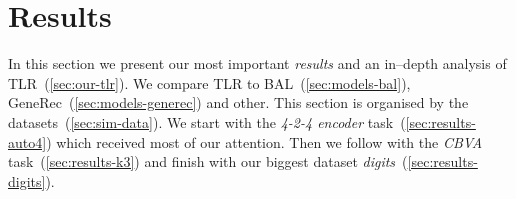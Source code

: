 

\section{Results} 
\label{sec:results} 

In this section we present our most important \emph{results} and an in--depth analysis of TLR~(\ref{sec:our-tlr}). We compare TLR to BAL~(\ref{sec:models-bal}), GeneRec~(\ref{sec:models-generec}) and other. This section is organised by the datasets~(\ref{sec:sim-data}). We start with the \emph{4-2-4 encoder} task~(\ref{sec:results-auto4}) which received most of our attention. Then we follow with the \emph{CBVA} task~(\ref{sec:results-k3}) and finish with our biggest dataset \emph{digits}~(\ref{sec:results-digits}). 

 

 

 

 

